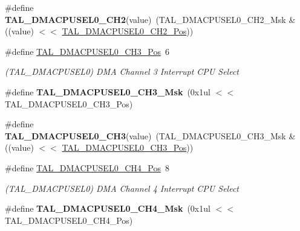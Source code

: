 \begin{DoxyCompactItemize}
\item 
\hypertarget{group___s_a_m_l21___t_a_l_gad39f524bf7dd84a283709e6822ba0a97}{}\#define {\bfseries T\+A\+L\+\_\+\+D\+M\+A\+C\+P\+U\+S\+E\+L0\+\_\+\+C\+H2}(value)~(T\+A\+L\+\_\+\+D\+M\+A\+C\+P\+U\+S\+E\+L0\+\_\+\+C\+H2\+\_\+\+Msk \& ((value) $<$$<$ \hyperlink{group___s_a_m_l21___t_a_l_ga7622e9b30020f338416fd58190beae64}{T\+A\+L\+\_\+\+D\+M\+A\+C\+P\+U\+S\+E\+L0\+\_\+\+C\+H2\+\_\+\+Pos}))\label{group___s_a_m_l21___t_a_l_gad39f524bf7dd84a283709e6822ba0a97}

\item 
\hypertarget{group___s_a_m_l21___t_a_l_gaaa506ec9d17d6455adbdcc5f5c2470b1}{}\#define \hyperlink{group___s_a_m_l21___t_a_l_gaaa506ec9d17d6455adbdcc5f5c2470b1}{T\+A\+L\+\_\+\+D\+M\+A\+C\+P\+U\+S\+E\+L0\+\_\+\+C\+H3\+\_\+\+Pos}~6\label{group___s_a_m_l21___t_a_l_gaaa506ec9d17d6455adbdcc5f5c2470b1}

\begin{DoxyCompactList}\small\item\em (T\+A\+L\+\_\+\+D\+M\+A\+C\+P\+U\+S\+E\+L0) D\+M\+A Channel 3 Interrupt C\+P\+U Select \end{DoxyCompactList}\item 
\hypertarget{group___s_a_m_l21___t_a_l_ga51d5747d624eec209e51db705d4dcf01}{}\#define {\bfseries T\+A\+L\+\_\+\+D\+M\+A\+C\+P\+U\+S\+E\+L0\+\_\+\+C\+H3\+\_\+\+Msk}~(0x1ul $<$$<$ T\+A\+L\+\_\+\+D\+M\+A\+C\+P\+U\+S\+E\+L0\+\_\+\+C\+H3\+\_\+\+Pos)\label{group___s_a_m_l21___t_a_l_ga51d5747d624eec209e51db705d4dcf01}

\item 
\hypertarget{group___s_a_m_l21___t_a_l_ga088b38cbca3d8266a0718be8697ee012}{}\#define {\bfseries T\+A\+L\+\_\+\+D\+M\+A\+C\+P\+U\+S\+E\+L0\+\_\+\+C\+H3}(value)~(T\+A\+L\+\_\+\+D\+M\+A\+C\+P\+U\+S\+E\+L0\+\_\+\+C\+H3\+\_\+\+Msk \& ((value) $<$$<$ \hyperlink{group___s_a_m_l21___t_a_l_gaaa506ec9d17d6455adbdcc5f5c2470b1}{T\+A\+L\+\_\+\+D\+M\+A\+C\+P\+U\+S\+E\+L0\+\_\+\+C\+H3\+\_\+\+Pos}))\label{group___s_a_m_l21___t_a_l_ga088b38cbca3d8266a0718be8697ee012}

\item 
\hypertarget{group___s_a_m_l21___t_a_l_ga8ddad4cd1b4db541059bd957490ec276}{}\#define \hyperlink{group___s_a_m_l21___t_a_l_ga8ddad4cd1b4db541059bd957490ec276}{T\+A\+L\+\_\+\+D\+M\+A\+C\+P\+U\+S\+E\+L0\+\_\+\+C\+H4\+\_\+\+Pos}~8\label{group___s_a_m_l21___t_a_l_ga8ddad4cd1b4db541059bd957490ec276}

\begin{DoxyCompactList}\small\item\em (T\+A\+L\+\_\+\+D\+M\+A\+C\+P\+U\+S\+E\+L0) D\+M\+A Channel 4 Interrupt C\+P\+U Select \end{DoxyCompactList}\item 
\hypertarget{group___s_a_m_l21___t_a_l_ga228149fd2b91746f572820799b9a79ee}{}\#define {\bfseries T\+A\+L\+\_\+\+D\+M\+A\+C\+P\+U\+S\+E\+L0\+\_\+\+C\+H4\+\_\+\+Msk}~(0x1ul $<$$<$ T\+A\+L\+\_\+\+D\+M\+A\+C\+P\+U\+S\+E\+L0\+\_\+\+C\+H4\+\_\+\+Pos)\label{group___s_a_m_l21___t_a_l_ga228149fd2b91746f572820799b9a79ee}


\end{DoxyCompactItemize}
